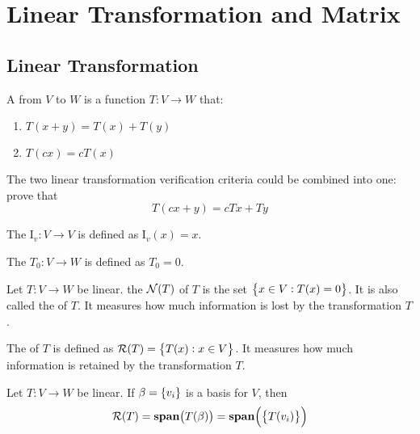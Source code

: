 \section{Linear Transformation and Matrix}

\subsection{Linear Transformation}


\begin{definition}
	A   from $V$ to $W$ is a function $T: V \rightarrow W$ that:
	\begin{enumerate}
		\item $T(x+y) = T(x) + T(y)$
		\item $T(c x) = c T(x)$
	\end{enumerate}
\end{definition}

The two linear transformation verification criteria could be combined into one: prove that 
\begin{equation}
    T(cx + y) = cTx+Ty
\end{equation}


The   $\mathrm{I}_v : V \rightarrow V$ is defined as $\mathrm{I}_v(x) = x$.

The   $T_0: V \rightarrow W$ is defined as $T_0 = 0$.

\begin{definition}
	Let $T:V \rightarrow W$ be linear. the   $\mathcal{N}(T)$ of $T$ is the set $\set{x \in V : T(x) = 0}$. It is also called the  of $T$. It measures how much  information is lost by the transformation $T$.
\end{definition}

\begin{definition}
	The   of $T$ is defined as $\mathcal{R}(T) = \set{ {T(x):x \in V}}$. It measures how much information is retained by the transformation $T$.
\end{definition}

\begin{theorem}
	Let $T: V \rightarrow W$ be linear. If $\beta=\set{v_i}$ is a basis for $V$, then
	\begin{equation}
		\rangespace{T} =  \vectorspan{T(\beta)} = \vectorspan{\set{T(v_i)}}
	\end{equation}
\end{theorem}

